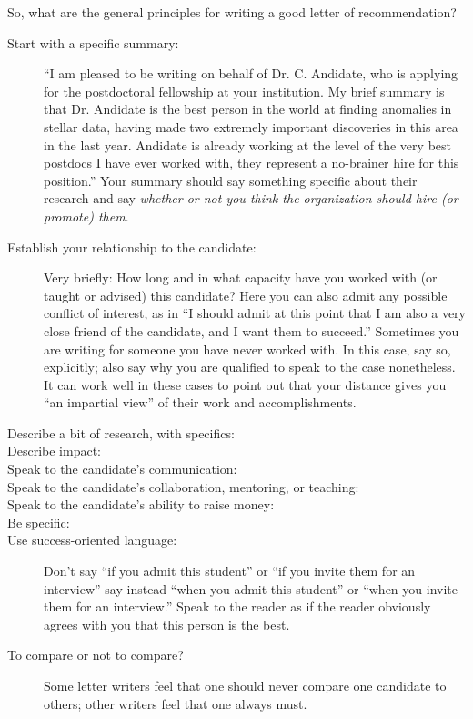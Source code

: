\documentclass[letterpaper]{book}
\begin{document}
So, what are the general principles for writing a good letter of recommendation?
\begin{description}
    \item[Start with a specific summary:]
    ``I am pleased to be writing on behalf of Dr. C. Andidate, who is applying for the postdoctoral fellowship at your institution. My brief summary is that Dr. Andidate is the best person in the world at finding anomalies in stellar data, having made two extremely important discoveries in this area in the last year. Andidate is already working at the level of the very best postdocs I have ever worked with, they represent a no-brainer hire for this position.''
    Your summary should say something specific about their research and say \emph{whether or not you think the organization should hire (or promote) them}.
    \item[Establish your relationship to the candidate:]
    Very briefly: How long and in what capacity have you worked with (or taught or advised) this candidate?
    Here you can also admit any possible conflict of interest, as in ``I should admit at this point that I am also a very close friend of the candidate, and I want them to succeed.''
    Sometimes you are writing for someone you have never worked with.
    In this case, say so, explicitly; also say why you are qualified to speak to the case nonetheless.
    It can work well in these cases to point out that your distance gives you ``an impartial view'' of their work and accomplishments.
    \item[Describe a bit of research, with specifics:]
    \item[Describe impact:]
    \item[Speak to the candidate's communication:]
    \item[Speak to the candidate's collaboration, mentoring, or teaching:]
    \item[Speak to the candidate's ability to raise money:]
    \item[Be specific:]
    \item[Use success-oriented language:]
    Don't say ``if you admit this student'' or ``if you invite them for an interview'' say instead ``when you admit this student'' or ``when you invite them for an interview.''
    Speak to the reader as if the reader obviously agrees with you that this person is the best.
    \item[To compare or not to compare?]
    Some letter writers feel that one should never compare one candidate to others; other writers feel that one always must.

\end{description}
\end{document}
